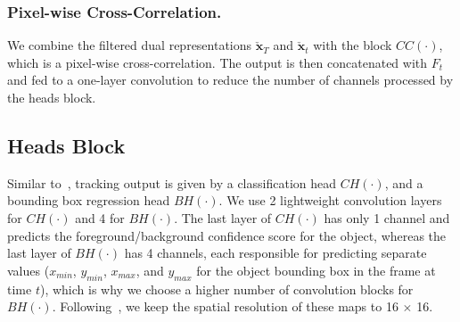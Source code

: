 \subsubsection{Pixel-wise Cross-Correlation.}
We combine the filtered dual representations $\boldsymbol{\check{x}}_T$ and $\boldsymbol{\check{x}}_t$ with the block $CC(\cdot)$, which is a pixel-wise cross-correlation. The output is then concatenated with $F_t$ and fed to a one-layer convolution to reduce the number of channels processed by the heads block.

\subsection{Heads Block}
Similar to~\cite{zhang2020ocean, borsuk2022fear}, tracking output is given by a classification head $CH(\cdot)$, and a bounding box regression head $BH(\cdot)$.
We use 2 lightweight convolution layers for $CH(\cdot)$ and 4 for $BH(\cdot)$.
The last layer of $CH(\cdot)$ has only 1 channel and predicts the foreground/background confidence score for the object, whereas the last layer of $BH(\cdot)$ has 4 channels, each responsible for predicting separate values ($x_{min}$, $y_{min}$, $x_{max}$, and $y_{max}$ for the object bounding box in the frame at time $t$), which is why we choose a higher number of convolution blocks for $BH(\cdot)$. Following~\cite{borsuk2022fear}, we keep the spatial resolution of these maps to 16 $\times$ 16. 

\begin{table}
\caption{Comparison of FLOPs, number of parameters, and latency when using MobileViTv3\cite{wadekar2022mobilevitv3}, Polarized Self-Attention\cite{liu2021polarized} and Fast Mixed Filtration, with their performances on AVisT \cite{noman2022avist} and LaSOT \cite{fan2021lasot}.}
  \label{tab:att_comp}
  \centering
\end{table}

